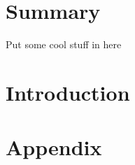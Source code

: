 \documentclass[11pt,]{article}
\begin{document}
\pagebreak


\section*{Summary}

Put some cool stuff in here

\pagebreak


{

\clearpage
\hypersetup{linkcolor=black}

\begin{singlespacing}{%
\setlength{\parskip}{0pt}

\tableofcontents

\clearpage
\listoffigures
{}
\pagebreak

\clearpage
\listoftables
{}
\pagebreak
}
\end{singlespacing}

}

\setcounter{page}{1}
\section{Introduction}

\cite{example}



\begin{singlespacing}
\clearpage
\hypersetup{linkcolor=black}
\printbibliography
\end{singlespacing}

\section*{Appendix}
\end{document}
